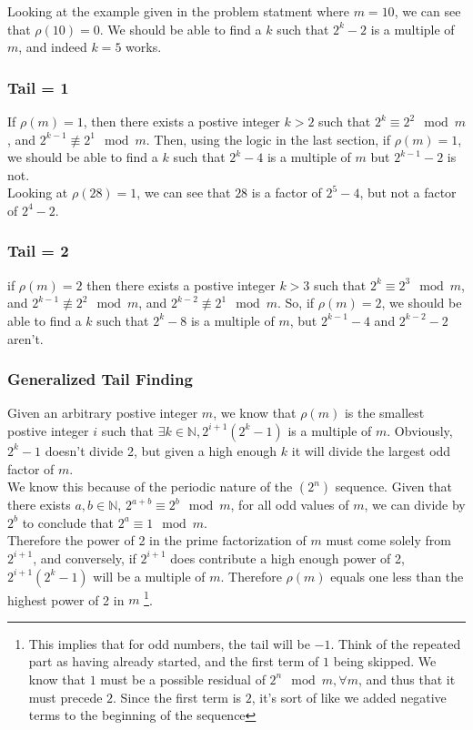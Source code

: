 \documentclass{article}
\begin{document}
  Looking at the example given in the problem statment where $m=10$, we can see that $\rho(10) = 0$. We should be able to find a $k$ such that $2^k -2$ is a multiple of $m$, and indeed $k=5$ works.
  \subsubsection{Tail = 1}
  If $\rho (m) = 1$, then there exists a postive integer $k > 2$ such that $2^k \equiv 2^2 \mod m$, and $2^{k-1} \not\equiv 2^1 \mod m.$ Then, using the logic in the last section, if $\rho(m) = 1$, we should be able to find a $k$ such that $2^k - 4$ is a multiple of $m$ but $2^{k-1} - 2$ is not.\\

  Looking at $\rho(28) = 1$, we can see that $28$ is a factor of $2^5 - 4$, but not a factor of $2^4 - 2$. 
  \subsubsection{Tail = 2}
  if $\rho (m) = 2$ then there exists a postive integer $k > 3$ such that $2^k \equiv 2^3 \mod m$, and $2^{k-1} \not\equiv 2^2 \mod m$, and $2^{k-2} \not\equiv 2^1 \mod m$. So, if $\rho(m) = 2$, we should be able to find a $k$ such that $2^k - 8$ is a multiple of $m$, but $2^{k-1} - 4$ and $2^{k-2} - 2$ aren't.
  \subsubsection{Generalized Tail Finding}
  Given an arbitrary postive integer $m$, we know that $\rho(m)$ is the smallest postive integer $i$ such that $\exists k \in \mathbb{N}, 2^{i+1}(2^k - 1)$ is a multiple of $m$. Obviously, $2^k-1$ doesn't divide 2, but given a high enough $k$ it will divide the largest odd factor of $m$.\\

  We know this because of the periodic nature of the $(2^n)$ sequence. Given that there exists $a, b \in \mathbb{N}$, $2^{a+b} \equiv 2^b \mod m$, for all odd values of $m$, we can divide by $2^b$ to conclude that $2^a \equiv 1 \mod m$.\\

  Therefore the power of 2 in the prime factorization of $m$ must come solely from $2^{i+1}$, and conversely, if $2^{i+1}$ does contribute a high enough power of 2, $2^{i+1}(2^k-1)$ will be a multiple of $m$. Therefore $\rho(m)$ equals one less than the highest power of 2 in $m$ \footnote{This implies that for odd numbers, the tail will be $-1$. Think of the repeated part as having already started, and the first term of $1$ being skipped. We know that $1$ must be a possible residual of $2^n \mod m, \forall m$, and thus that it must precede $2$. Since the first term is $2$, it's sort of like we added negative terms to the beginning of the sequence}.
\end{document}
